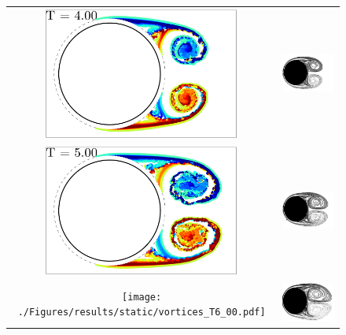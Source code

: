 \begin{figure}
 \begin{center}
 \begin{tabular}{cc}
 \includegraphics[width=6.5cm]{./Figures/results/static/vortices_T4_00.pdf}  &
 \includegraphics[width=6.5cm]{./Figures/results/static/KOU_Re1000_T4.png}  \\
 \includegraphics[width=6.5cm]{./Figures/results/static/vortices_T5_00.pdf}  &
 \includegraphics[width=6.5cm]{./Figures/results/static/KOU_Re1000_T5.png}  \\
 \texttt{[image: ./Figures/results/static/vortices\_T6\_00.pdf]}  &
 \includegraphics[width=6.5cm]{./Figures/results/static/KOU_Re1000_T6.png}  \\

\end{tabular}
\end{center}
\end{figure}
